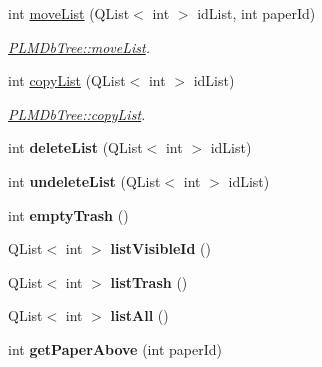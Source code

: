 \begin{DoxyCompactItemize}
\item 
int \hyperlink{class_p_l_m_db_tree_aec9236c55a24d2bae0ee26a5f78b55a2}{move\+List} (Q\+List$<$ int $>$ id\+List, int paper\+Id)
\begin{DoxyCompactList}\small\item\em \hyperlink{class_p_l_m_db_tree_aec9236c55a24d2bae0ee26a5f78b55a2}{P\+L\+M\+Db\+Tree\+::move\+List}. \end{DoxyCompactList}\item 
int \hyperlink{class_p_l_m_db_tree_aeaa59f400d18e4b299ee4b64bd0755d0}{copy\+List} (Q\+List$<$ int $>$ id\+List)
\begin{DoxyCompactList}\small\item\em \hyperlink{class_p_l_m_db_tree_aeaa59f400d18e4b299ee4b64bd0755d0}{P\+L\+M\+Db\+Tree\+::copy\+List}. \end{DoxyCompactList}\item 
int {\bfseries delete\+List} (Q\+List$<$ int $>$ id\+List)\hypertarget{class_p_l_m_db_tree_ab3adc738f0f85176c9683e50a45c56cf}{}\label{class_p_l_m_db_tree_ab3adc738f0f85176c9683e50a45c56cf}

\item 
int {\bfseries undelete\+List} (Q\+List$<$ int $>$ id\+List)\hypertarget{class_p_l_m_db_tree_a38c4400623873f8fb0c4e7e93d192fd5}{}\label{class_p_l_m_db_tree_a38c4400623873f8fb0c4e7e93d192fd5}

\item 
int {\bfseries empty\+Trash} ()\hypertarget{class_p_l_m_db_tree_a85022035f9a223c3299f56302c60e637}{}\label{class_p_l_m_db_tree_a85022035f9a223c3299f56302c60e637}

\item 
Q\+List$<$ int $>$ {\bfseries list\+Visible\+Id} ()\hypertarget{class_p_l_m_db_tree_a997d67ba34d62868e94411b226e8477b}{}\label{class_p_l_m_db_tree_a997d67ba34d62868e94411b226e8477b}

\item 
Q\+List$<$ int $>$ {\bfseries list\+Trash} ()\hypertarget{class_p_l_m_db_tree_a7ba474277585d6fd8af2eda724ca381c}{}\label{class_p_l_m_db_tree_a7ba474277585d6fd8af2eda724ca381c}

\item 
Q\+List$<$ int $>$ {\bfseries list\+All} ()\hypertarget{class_p_l_m_db_tree_a993d122fd1c2da3920ceaaccb14fe713}{}\label{class_p_l_m_db_tree_a993d122fd1c2da3920ceaaccb14fe713}

\item 
int {\bfseries get\+Paper\+Above} (int paper\+Id)\hypertarget{class_p_l_m_db_tree_a6c9df6e19f061259cffc41bf5e85a0bc}{}\label{class_p_l_m_db_tree_a6c9df6e19f061259cffc41bf5e85a0bc}


\end{DoxyCompactItemize}
